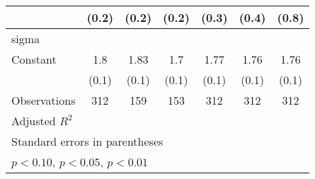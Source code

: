 \begin{table}[htbp]
\begin{tabular}{l*{6}{c}}
                &    (0.2)         &    (0.2)         &    (0.2)         &    (0.3)         &    (0.4)         &    (0.8)         \\
\hline
sigma           &                  &                  &                  &                  &                  &                  \\
Constant        &      1.8\sym{***}&     1.83\sym{***}&      1.7\sym{***}&     1.77\sym{***}&     1.76\sym{***}&     1.76\sym{***}\\
                &    (0.1)         &    (0.1)         &    (0.1)         &    (0.1)         &    (0.1)         &    (0.1)         \\
\hline
Observations    &      312         &      159         &      153         &      312         &      312         &      312         \\
Adjusted \(R^{2}\)&                  &                  &                  &                  &                  &                  \\
\hline\hline
\multicolumn{7}{l}{\footnotesize Standard errors in parentheses}\\
\multicolumn{7}{l}{\footnotesize \sym{*} \(p<0.10\), \sym{**} \(p<0.05\), \sym{***} \(p<0.01\)}\\
\end{tabular}
\end{table}
